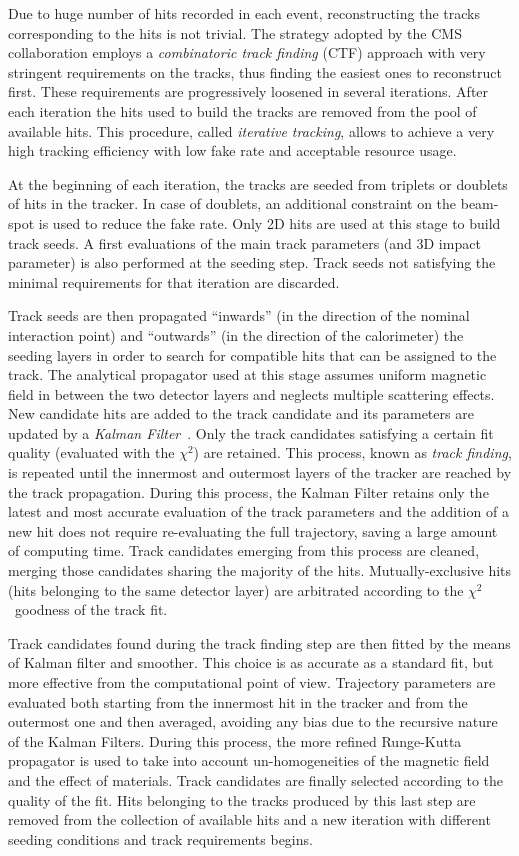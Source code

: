 Due to huge number of hits recorded in each event, reconstructing the tracks corresponding to the hits is not trivial. The strategy adopted by the CMS collaboration employs a \emph{combinatoric track finding} (CTF) approach with very stringent requirements on the tracks, thus finding the easiest ones to reconstruct first. These requirements are progressively loosened in several iterations. After each iteration the hits used to build the tracks are removed from the pool of available hits. This procedure, called \emph{iterative tracking}, allows to achieve a very high tracking efficiency with low fake rate and acceptable resource usage. 

At the beginning of each iteration, the tracks are seeded from triplets or doublets of hits in the tracker. In case of doublets, an additional constraint on the beam-spot is used to reduce the fake rate. Only 2D hits are used at this stage to build track seeds. A first evaluations of the main track parameters (\pT and 3D impact parameter) is also performed at the seeding step. Track seeds not satisfying the minimal requirements for that iteration are discarded.

Track seeds are then propagated ``inwards'' (in the direction of the nominal interaction point) and ``outwards'' (in the direction of the calorimeter) the seeding layers in order to search for compatible hits that can be assigned to the track. The analytical propagator used at this stage assumes uniform magnetic field in between the two detector layers and neglects multiple scattering effects. New candidate hits are added to the track candidate and its parameters are updated by a \emph{Kalman Filter}~\cite{Fruhwirth:1987fm}. Only the track candidates satisfying a certain fit quality (evaluated with the $\chi^2$) are retained. This process, known as \emph{track finding}, is repeated until the innermost and outermost layers of the tracker are reached by the track propagation. During this process, the Kalman Filter retains only the latest and most accurate evaluation of the track parameters and the addition of a new hit does not require re-evaluating the full trajectory, saving a large amount of computing time. Track candidates emerging from this process are cleaned, merging those candidates sharing the majority of the hits. Mutually-exclusive hits (hits belonging to the same detector layer) are arbitrated according to the $\chi^2$\ goodness of the track fit.

Track candidates found during the track finding step are then fitted by the means of Kalman filter and smoother. This choice is as accurate as a standard fit, but more effective from the computational point of view. Trajectory parameters are evaluated both starting from the innermost hit in the tracker and from the outermost one and then averaged, avoiding any bias due to the recursive nature of the Kalman Filters. During this process, the more refined Runge-Kutta propagator is used to take into account un-homogeneities of the magnetic field and the effect of materials. Track candidates are finally selected according to the quality of the fit. Hits belonging to the tracks produced by this last step are removed from the collection of available hits and a new iteration with different seeding conditions and track requirements begins. 

